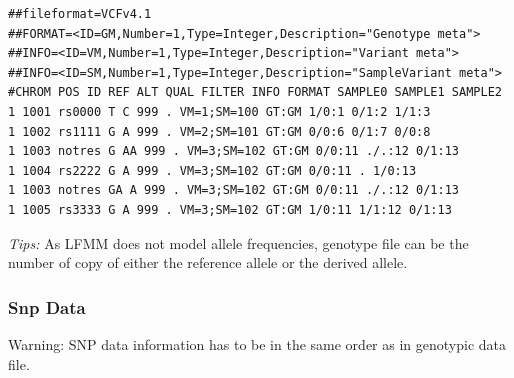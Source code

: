 \documentclass[10pt,a4paper]{article}
\begin{document}
\begin{itemize}
\begin{center}
\footnotesize
\begin{Verbatim}[frame=single]
##fileformat=VCFv4.1
##FORMAT=<ID=GM,Number=1,Type=Integer,Description="Genotype meta">
##INFO=<ID=VM,Number=1,Type=Integer,Description="Variant meta">
##INFO=<ID=SM,Number=1,Type=Integer,Description="SampleVariant meta">
#CHROM POS ID REF ALT QUAL FILTER INFO FORMAT SAMPLE0 SAMPLE1 SAMPLE2
1 1001 rs0000 T C 999 . VM=1;SM=100 GT:GM 1/0:1 0/1:2 1/1:3
1 1002 rs1111 G A 999 . VM=2;SM=101 GT:GM 0/0:6 0/1:7 0/0:8
1 1003 notres G AA 999 . VM=3;SM=102 GT:GM 0/0:11 ./.:12 0/1:13
1 1004 rs2222 G A 999 . VM=3;SM=102 GT:GM 0/0:11 . 1/0:13
1 1003 notres GA A 999 . VM=3;SM=102 GT:GM 0/0:11 ./.:12 0/1:13
1 1005 rs3333 G A 999 . VM=3;SM=102 GT:GM 1/0:11 1/1:12 0/1:13
\end{Verbatim}
\end{center}


\end{itemize}
{\it Tips:} As LFMM does not model allele frequencies, genotype file can be
the number of copy of either the reference allele or the derived allele.

\subsubsection{Snp Data}
Warning: SNP data information has to be in the same order as in genotypic data file.
\end{document}
